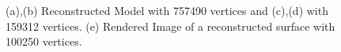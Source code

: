 \documentclass[preprint,5p,times,twocolumn]{elsarticle}
\begin{document}
\begin{figure}[!h]
\centering
\end{figure}
\begin{figure}[!h]
\centering
	\caption{
		(a),(b) Reconstructed Model with 757490 vertices and (c),(d) with 159312 vertices. (e) Rendered Image of a reconstructed surface with 100250 vertices.
	}
\end{figure}



\end{document}
